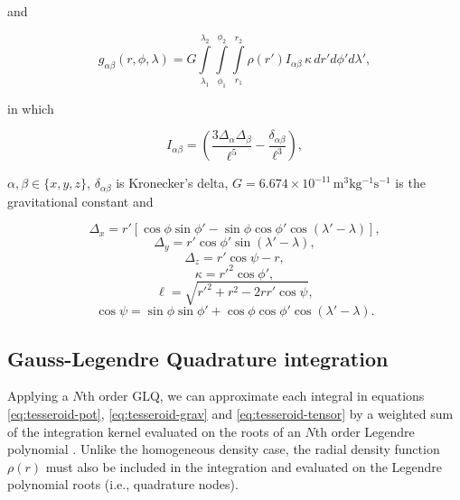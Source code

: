 \documentclass[extra, referee]{gji}
\begin{document}
\noindent and

\begin{equation}
    g_{\alpha\beta}(r,\phi,\lambda) = G
    \int\limits_{\lambda_1}^{\lambda_2}
    \int\limits_{\phi_1}^{\phi_2}
    \int\limits_{r_1}^{r_2}
    \rho(r') I_{\alpha\beta} \, \kappa \, dr' d\phi' d\lambda' ,
    \label{eq:tesseroid-tensor}
\end{equation}

\noindent in which

\begin{equation}
    I_{\alpha\beta} =
    \left(
        \frac{3\Delta_{\alpha} \Delta_{\beta}}{\ell^5} -
        \frac{\delta_{\alpha\beta}}{\ell^3}
    \right) ,
    \label{eq:tesseroid-tensor-kernel}
\end{equation}

\noindent $\alpha, \beta \in \{x, y, z\}$, $\delta_{\alpha\beta}$ is Kronecker's delta,
$G = 6.674\times10^{-11}\, \text{m$^3$kg$^{-1}$s$^{-1}$}$ is the gravitational constant
and

\begin{equation}
    \Delta_x = r'[\cos\phi\sin\phi' - \sin\phi\cos\phi'
               \cos(\lambda' - \lambda)],
\end{equation}
\begin{equation}
    \Delta_y = r' \cos \phi' \sin(\lambda' - \lambda),
\end{equation}
\begin{equation}
    \Delta_z = r' \cos \psi - r,
\end{equation}
\begin{equation}
    \kappa = {r'}^2 \cos \phi',
\end{equation}
\begin{equation}
    \ell = \sqrt{{r'}^2 + r^2 - 2 r r' \cos \psi},
\label{eq:ell}
\end{equation}
\begin{equation}
    \cos\psi = \sin\phi\sin\phi' + \cos\phi\cos\phi'
                 \cos(\lambda' - \lambda).
\label{eq:cospsi}
\end{equation}

\subsection{Gauss-Legendre Quadrature integration}

Applying a $N$th order GLQ, we can approximate each integral in equations
\ref{eq:tesseroid-pot}, \ref{eq:tesseroid-grav} and \ref{eq:tesseroid-tensor} by a
weighted sum of the integration kernel evaluated on the roots of an $N$th order Legendre
polynomial \citep[p.~390]{Hildebrand1987}.
Unlike the homogeneous density case, the radial density function $\rho(r)$ must also be
included in the integration and evaluated on the Legendre polynomial roots (i.e.,
quadrature nodes).
\end{document}
